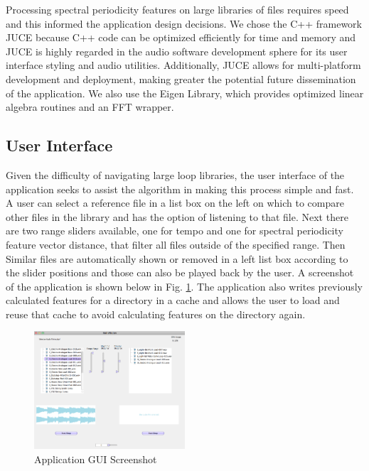 \documentclass{article}
\begin{document}
Processing spectral periodicity features on large libraries of files requires speed and this informed the application design decisions. We chose the C++ framework JUCE \cite{juce} because C++ code can be optimized efficiently for time and memory and JUCE is highly regarded in the audio software development sphere for its user interface styling and audio utilities. Additionally, JUCE allows for multi-platform development and deployment, making greater the potential future dissemination of the application. We also use the Eigen Library, which provides optimized linear algebra routines and an FFT wrapper.

\subsection{User Interface}
Given the difficulty of navigating large loop libraries, the user interface of the application seeks to assist the algorithm in making this process simple and fast. A user can select a reference file in a list box on the left on which to compare other files in the library and has the option of listening to that file. Next there are two range sliders available, one for tempo and one for spectral periodicity feature vector distance, that filter all files outside of the specified range. Then Similar files are automatically shown or removed in a left list box according to the slider positions and those can also be played back by the user. A screenshot of the application is shown below in Fig. \ref{fig:gui}. The application also writes previously calculated features for a directory in a cache and allows the user to load and reuse that cache to avoid calculating features on the directory again.

\begin{figure}[h!]
  \centering
    \includegraphics[width=0.5\textwidth]{fLoop_gui.png}
      \caption{Application GUI Screenshot}\label{fig:gui}
\end{figure}
\end{document}
